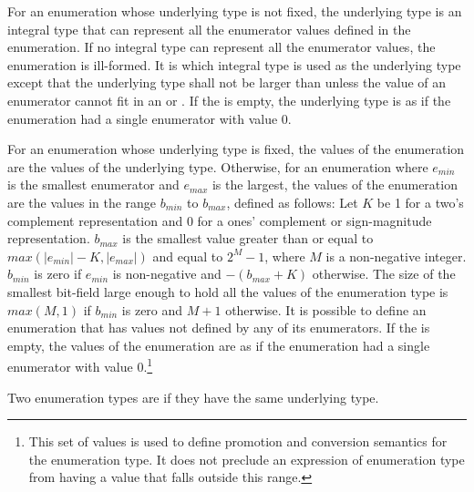 \pnum
For an enumeration whose underlying type is not fixed,
the underlying type
is an
integral type that can represent all the enumerator values defined in
the enumeration. If no integral type can represent all the enumerator
values, the enumeration is ill-formed. It is 
which integral type is used as the underlying type 
except that the underlying type shall not be larger than 
unless the value of an enumerator cannot fit in an  or
. If the  is empty, the
underlying type is as if the enumeration had a single enumerator with
value 0.

\pnum
For an enumeration whose underlying type is fixed, the values of
the enumeration are the values of the underlying type. Otherwise,
for an enumeration where $e_\mathit{min}$ is the smallest enumerator and
$e_\mathit{max}$ is the largest, the values of the enumeration are the
values in the range $b_{min}$ to $b_{max}$, defined as follows: Let $K$
be 1 for a two's complement representation and 0 for a ones' complement
or sign-magnitude representation. $b_{max}$ is the smallest value
greater than or equal to $max(|e_{min}| - K, |e_{max}|)$ and equal to
$2^M-1$, where $M$ is a non-negative integer. $b_{min}$ is zero if
$e_{min}$ is non-negative and $-(b_{max}+K)$ otherwise. The size of the
smallest bit-field large enough to hold all the values of the
enumeration type is $max(M,1)$ if $b_{min}$ is zero and $M+1$ otherwise.
It is possible to define an enumeration that has values not defined by
any of its enumerators. If the  is empty, the
values of the enumeration are as if the enumeration had a single enumerator with
value 0.\footnote{This set of values is used to define promotion and
conversion semantics for the enumeration type. It does not preclude an
expression of enumeration type from having a value that falls outside
this range.}

\pnum
Two enumeration types are 
if they have the same underlying type.

